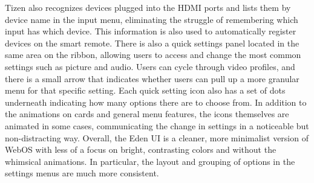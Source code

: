 \documentclass[12pt, letterpaper]{article}
\begin{document}
Tizen also recognizes devices plugged into the HDMI ports and lists them by device name in the input menu, eliminating the struggle of remembering which input has which device.  This information is also used to automatically register devices on the smart remote.
There is also a quick settings panel located in the same area on the ribbon, allowing users to access and change the most common settings such as picture and audio. Users can cycle through video profiles, and there is a small arrow that indicates whether users can pull up a more granular menu for that specific setting.  Each quick setting icon also has a set of dots underneath indicating how many options there are to choose from.
In addition to the animations on cards and general menu features, the icons themselves are animated in some cases, communicating the change in settings in a noticeable but non-distracting way.  Overall, the Eden UI is a cleaner, more minimalist version of WebOS with less of a focus on bright, contrasting colors and without the whimsical animations. In particular, the layout and grouping of options in the settings menus are much more consistent.
\end{document}
